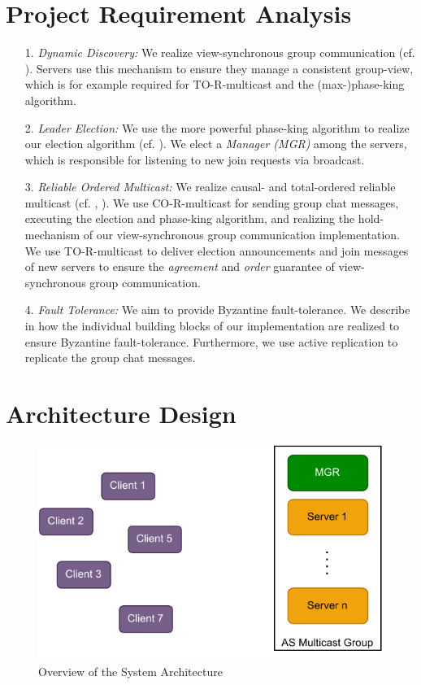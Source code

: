 \documentclass[runningheads]{llncs}
\begin{document}
\section{Project Requirement Analysis} \label{sec:req_analysis}
\begin{enumerate}
    \item[1.] \textit{Dynamic Discovery:} We realize view-synchronous group communication (cf. ). Servers use this mechanism to ensure they manage a consistent group-view, which is for example required for TO-R-multicast and the (max-)phase-king algorithm.
    \item[2.] \textit{Leader Election:} We use the more powerful phase-king algorithm to realize our election algorithm (cf. ). We elect a \textit{Manager (MGR)} among the servers, which is responsible for listening to new join requests via broadcast. 
    \item[3.] \textit{Reliable Ordered Multicast:} We realize causal- and total-ordered reliable multicast (cf. , ). We use CO-R-multicast for sending group chat messages, executing the election and phase-king algorithm, and realizing the hold-mechanism of our view-synchronous group communication implementation. We use TO-R-multicast to deliver election announcements and join messages of new servers to ensure the \textit{agreement} and \textit{order} guarantee of view-synchronous group communication.
    \item[4.] \textit{Fault Tolerance:} We aim to provide Byzantine fault-tolerance. We describe in  how the individual building blocks of our implementation are realized to ensure Byzantine fault-tolerance. Furthermore, we use active replication to replicate the group chat messages.
\end{enumerate}

\section{Architecture Design} \label{sec:arch_design}

\begin{figure}[t]
    \centering
    \includegraphics[scale=0.7]{graphics/DS_Architecture.pdf}
    \caption{Overview of the System Architecture}
    \label{fig:overview}
\end{figure}
\end{document}
